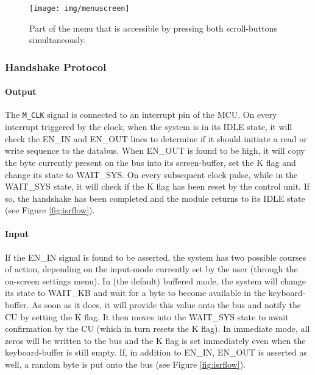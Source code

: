 \begin{figure}[h]
  \centering
  \texttt{[image: img/menuscreen]}
  \caption{Part of the menu that is accessible by pressing both scroll-buttons simultaneously.}
  \label{fig:menuscreen}
\end{figure}


\subsubsection{Handshake Protocol}
\paragraph{Output} The \texttt{M\_CLK} signal is connected to an interrupt pin of the MCU. On every interrupt triggered by the clock, when the system is in its IDLE state, it will check the EN\_IN and EN\_OUT lines to determine if it should initiate a read or write sequence to the databus. When EN\_OUT is found to be high, it will copy the byte currently present on the bus into its screen-buffer, set the K flag and change its state to WAIT\_SYS. On every subsequent clock pulse, while in the WAIT\_SYS state, it will check if the K flag has been reset by the control unit. If so, the handshake has been completed and the module returns to its IDLE state (see Figure \ref{fig:isrflow}).

\paragraph{Input} If the EN\_IN signal is found to be asserted, the system has two possible courses of action, depending on the input-mode currently set by the user (through the on-screen settings menu). In (the default) buffered mode, the system will change its state to WAIT\_KB and wait for a byte to become available in the keyboard-buffer. As soon as it does, it will provide this value onto the bus and notify the CU by setting the K flag. It then moves into the WAIT\_SYS state to await confirmation by the CU (which in turn resets the K flag). In immediate mode, all zeros will be written to the bus and the K flag is set immediately even when the keyboard-buffer is still empty. If, in addition to EN\_IN, EN\_OUT is asserted as well, a random byte is put onto the bus (see Figure \ref{fig:isrflow}).

